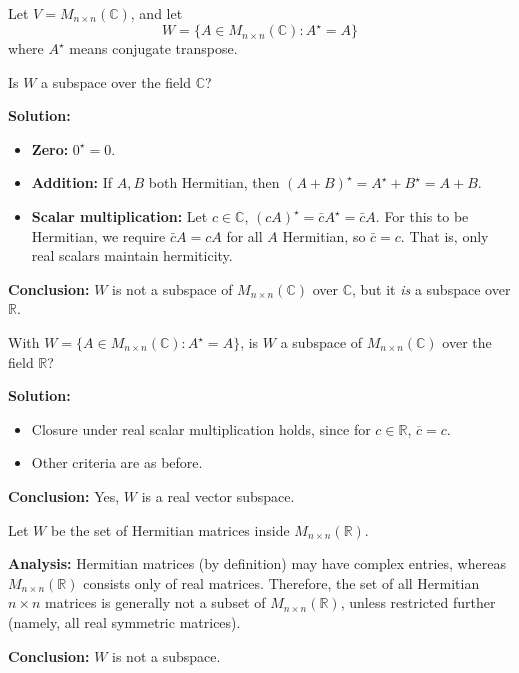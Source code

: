 \documentclass[11pt,a4paper]{article}
\theoremstyle{definition}
\theoremstyle{plain}
\theoremstyle{remark}
\begin{document}
\begin{original_example}[title=Hermitian Matrices as a Subspace]
Let $V = M_{n\times n}(\mathbb{C})$, and let 
\[
    W = \{A \in M_{n\times n}(\mathbb{C}) : A^\star = A\}
\]
where $A^\star$ means conjugate transpose.

Is $W$ a subspace over the field $\mathbb{C}$?

\textbf{Solution:}
\begin{itemize}
    \item \textbf{Zero:} $0^\star = 0$.
    \item \textbf{Addition:} If $A, B$ both Hermitian, then $(A+B)^\star = A^\star + B^\star = A + B$.
    \item \textbf{Scalar multiplication:} Let $c \in \mathbb{C}$, $(cA)^\star = \bar{c}A^\star = \bar{c}A$. For this to be Hermitian, we require $\bar{c}A = cA$ for all $A$ Hermitian, so $\bar{c}=c$. That is, only real scalars maintain hermiticity.
\end{itemize}
\textbf{Conclusion:} $W$ is not a subspace of $M_{n\times n}(\mathbb{C})$ over $\mathbb{C}$, but it \emph{is} a subspace over $\mathbb{R}$.
\end{original_example}

\begin{original_example}[title=Hermitian Matrices as Subspace over $\mathbb{R}$]
With $W = \{A \in M_{n\times n}(\mathbb{C}) : A^\star = A\}$, is $W$ a subspace of $M_{n\times n}(\mathbb{C})$ over the field $\mathbb{R}$?

\textbf{Solution:}
\begin{itemize}
    \item Closure under real scalar multiplication holds, since for $c \in \mathbb{R}$, $\overline{c}=c$.
    \item Other criteria are as before.
\end{itemize}
\textbf{Conclusion:} Yes, $W$ is a real vector subspace.
\end{original_example}

\begin{original_example}[title=Hermitian Matrices inside Real Matrices]
Let $W$ be the set of Hermitian matrices inside $M_{n\times n}(\mathbb{R})$.

\textbf{Analysis:} Hermitian matrices (by definition) may have complex entries, whereas $M_{n\times n}(\mathbb{R})$ consists only of real matrices. Therefore, the set of all Hermitian $n \times n$ matrices is generally not a subset of $M_{n\times n}(\mathbb{R})$, unless restricted further (namely, all real symmetric matrices).

\textbf{Conclusion:} $W$ is not a subspace.
\end{original_example}
\end{document}
